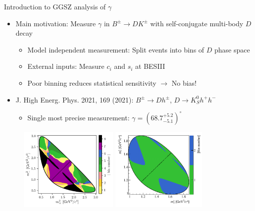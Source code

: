 \documentclass{beamer}
\begin{document}
\begin{frame}{Introduction to GGSZ analysis of $\gamma$}
  \begin{itemize}
    \setlength\itemsep{0.5em}
    \item{Main motivation: Measure $\gamma$ in $B^\pm\to DK^\pm$ with self-conjugate multi-body $D$ decay}
    \begin{itemize}
      \item{Model independent measurement: Split events into bins of $D$ phase space}
      \item{External inputs: Measure $c_i$ and $s_i$ at BESIII}
      \item{Poor binning reduces statistical sensitivity $\to$ No bias!}
    \end{itemize}
    \item{J. High Energ. Phys. 2021, 169 (2021): $B^\pm\to Dh^\pm$, $D\to K_S^0 h^+h^-$}
    \begin{itemize}
      \item{Single most precise measurement: $\gamma = (68.7^{+5.2}_{-5.1})^\circ$}
    \end{itemize}
  \end{itemize}
  \begin{figure}
    \includegraphics[height = 4cm]{Plots/KsPiPi_optimal.png}
    \includegraphics[height = 4cm]{Plots/KsKK_binning.png}
  \end{figure}
\end{frame}
\end{document}
